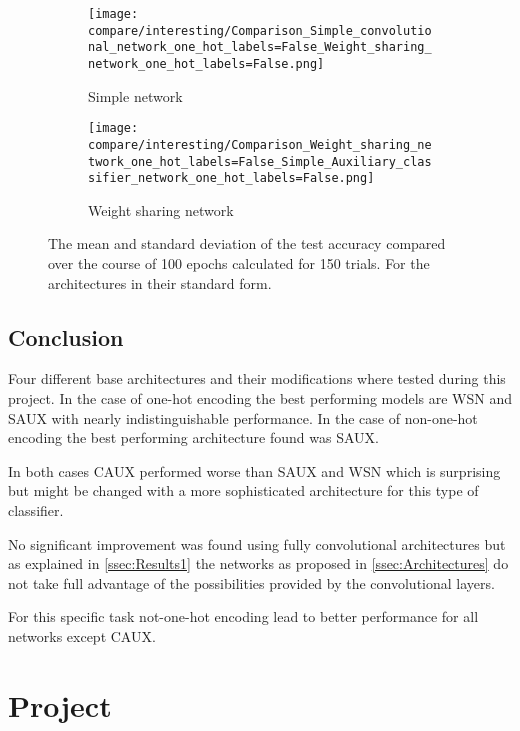\documentclass[11pt,english]{article}
\begin{document}
	\begin{figure*}
		\centering
		\begin{subfigure}[b]{0.475\textwidth}
			\centering
			\texttt{[image: compare/interesting/Comparison\_Simple\_convolutional\_network\_one\_hot\_labels=False\_Weight\_sharing\_network\_one\_hot\_labels=False.png]}
			\caption[]%
			{{\small Simple network}}    
		\end{subfigure}
		\hfill
		\begin{subfigure}[b]{0.475\textwidth}  
			\centering 
			\texttt{[image: compare/interesting/Comparison\_Weight\_sharing\_network\_one\_hot\_labels=False\_Simple\_Auxiliary\_classifier\_network\_one\_hot\_labels=False.png]}
			\caption[]%
			{{\small Weight sharing network}} 
		\end{subfigure}
		\hfill
		\caption[]
		{The mean and standard deviation of the test accuracy compared over the course of 100 epochs calculated for 150 trials. For the architectures in their standard form.} 
		\label{fig:comp_int}
	\end{figure*}

	\subsection{Conclusion}
	Four different base architectures and their modifications where tested during this project. In the case of one-hot encoding the best performing models are WSN and SAUX with nearly indistinguishable performance. In the case of non-one-hot encoding the best performing architecture found was SAUX. 
	
	In both cases CAUX performed worse than SAUX and WSN which is surprising but might be changed with a more sophisticated architecture for this type of classifier.
	
	No significant improvement was found using fully convolutional architectures but as explained in \cref{ssec:Results1} the networks as proposed in \cref{ssec:Architectures} do not take full advantage of the possibilities provided by the convolutional layers.
	
	For this specific task not-one-hot encoding lead to better performance for all networks except CAUX.

	\section{Project} \label{sec:Proj2}
	\vspace{-10pt}
	
\end{document}
